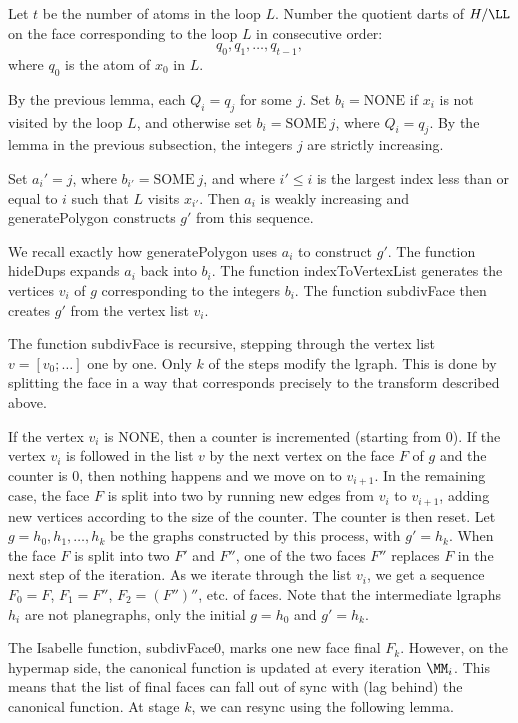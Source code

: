 \begin{lemma}
\begin{lemma}
Let $t$ be the number of atoms in the loop $L$.  Number the quotient
darts of $H/\LL$ on the face corresponding to the loop $L$ in
consecutive order:
\[
q_0,q_1,\ldots,q_{t-1},
\]
where $q_0$ is the atom of $x_0$ in $L$.

By the previous lemma, each $Q_i = q_j$ for some $j$.
Set $b_i = \text{NONE}$
if $x_i$ is not visited by the loop $L$, and otherwise set 
$b_i = \text{SOME}~j$,
where $Q_i = q_j$.
By the  lemma in the previous subsection, 
the integers $j$ are strictly increasing.

Set $a_i' = j$, where $b_{i'} = \text{SOME}~j$, and
where $i'\le i$ is the largest index less than or equal to $i$ such
that $L$ visits $x_{i'}$.  Then $a_i$ is weakly increasing and
generatePolygon constructs $g'$ from this sequence.

We recall exactly how generatePolygon uses $a_i$ to construct
$g'$.  The function hideDups expands $a_i$ back into $b_i$.
The function indexToVertexList generates the
vertices $v_i$ of $g$ corresponding to the integers $b_i$.
The function subdivFace then creates $g'$ from the vertex list $v_i$.

The function subdivFace is recursive, stepping through the vertex list
$v=[v_0;\ldots]$ one by one.  Only $k$ of the steps modify the lgraph.
This is done by splitting the face in a way that corresponds precisely
to the transform described above.

If the vertex $v_i$ is NONE, then a counter is incremented (starting
from 0).  If the vertex $v_i$ is followed in the list $v$ by the next
vertex on the face $F$ of $g$ and the counter is $0$, then nothing
happens and we move on to $v_{i+1}$.  In the remaining case, the face
$F$ is split into two by running new edges from $v_i$ to $v_{i+1}$,
adding new vertices according to the size of the counter.  The counter
is then reset.  Let $g=h_0,h_1,\ldots,h_k$ be the graphs constructed
by this process, with $g' = h_k$.  When the face $F$ is split into two
$F'$ and $F''$, one of the two faces $F''$ replaces $F$ in the next
step of the iteration.  As we iterate through the list $v_i$, we get a
sequence $F_0=F$, $F_1 =F''$, $F_2 = (F'')''$, etc.  of faces.  Note
that the intermediate lgraphs $h_i$ are not planegraphs, only the
initial $g=h_0$ and $g'=h_k$.

The Isabelle function, subdivFace0, marks one new face final $F_k$.
However, on the hypermap side, the canonical function is updated at
every iteration $\MM_i$.  This means that the list of final faces can
fall out of sync with (lag behind) the canonical function.  At stage
$k$, we can resync using the following lemma.


\end{lemma}
\end{lemma}
